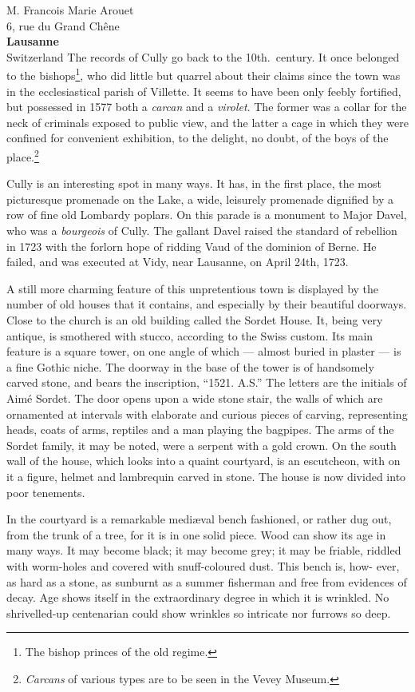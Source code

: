 \documentclass[11pt,french,bruni]{hletter}
\begin{document}
\begin{letter}{M. Francois Marie Arouet \\
               6, rue du Grand Ch\^{e}ne \\
               \textbf{Lausanne} \\
               Switzerland}
The records of Cully go back to the 10th.\ century. It once belonged to the
bishops\footnote{The bishop princes of the old regime.}, who did little but
quarrel about their claims since the town was in the ecclesiastical parish of
Villette. It seems to have been only feebly fortified, but possessed in 1577
both a \emph{carcan} and a \emph{virolet}\@. The former was a collar for the
neck of criminals exposed to public view, and the latter a cage in which they
were confined for convenient exhibition, to the delight, no doubt, of the
boys of the place.\footnote{\emph{Carcans} of various types are to be seen in
the Vevey Museum.}


Cully is an interesting spot in many ways. It has, in the first place,
the most picturesque promenade on the Lake, a wide, leisurely promenade
dignified by a row of fine old Lombardy poplars. On this parade is a
monument to Major Davel, who was a \emph{bourgeois} of Cully. The
gallant Davel raised the standard of rebellion in 1723 with the forlorn
hope of ridding Vaud of the dominion of Berne. He failed, and was
executed at Vidy, near Lausanne, on April 24th, 1723.

A still more charming feature of this unpretentious town is displayed
by the number of old houses that it contains, and especially by their
beautiful doorways. Close to the church is an old building called the
Sordet House. It, being very antique, is smothered with stucco,
according to the Swiss custom. Its main feature is a square tower, on
one angle of which --- almost buried in plaster --- is a fine Gothic
niche. The doorway in the base of the tower is of handsomely carved
stone, and bears the inscription, ``1521. A.S.'' The letters are the
initials of Aim\'{e} Sordet. The door opens upon a wide stone stair, the
walls of which are ornamented at intervals with elaborate and curious
pieces of carving, representing heads, coats of arms, reptiles and a
man playing the bagpipes. The arms of the Sordet family, it may be
noted, were a serpent with a gold crown. On the south wall of the
house, which looks into a quaint courtyard, is an escutcheon, with on
it a figure, helmet and lambrequin carved in stone. The house is now
divided into poor tenements.

In the courtyard is a remarkable medi\ae val bench fashioned, or rather
dug out, from the trunk of a tree, for it is in one solid piece. Wood
can show its age in many ways. It may become black; it may become grey;
it may be friable, riddled with worm-holes and covered with
snuff-coloured dust. This bench is, how- ever, as hard as a stone, as
sunburnt as a summer fisherman and free from evidences of decay. Age
shows itself in the extraordinary degree in which it is wrinkled. No
shrivelled-up centenarian could show wrinkles so intricate nor furrows
so deep.


\end{letter}
\end{document}
